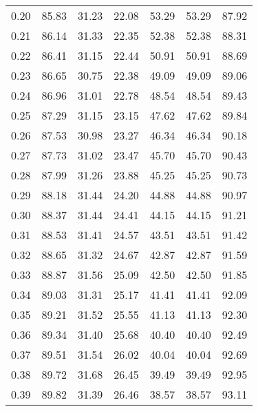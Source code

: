 \begin{tabular}{|c|c|c|c|c|c|c|}
      0.20 &     85.83 &     31.23 &      22.08 &   53.29 &      53.29 &         87.92 \\
      0.21 &     86.14 &     31.33 &      22.35 &   52.38 &      52.38 &         88.31 \\
      0.22 &     86.41 &     31.15 &      22.44 &   50.91 &      50.91 &         88.69 \\
      0.23 &     86.65 &     30.75 &      22.38 &   49.09 &      49.09 &         89.06 \\
      0.24 &     86.96 &     31.01 &      22.78 &   48.54 &      48.54 &         89.43 \\
      0.25 &     87.29 &     31.15 &      23.15 &   47.62 &      47.62 &         89.84 \\
      0.26 &     87.53 &     30.98 &      23.27 &   46.34 &      46.34 &         90.18 \\
      0.27 &     87.73 &     31.02 &      23.47 &   45.70 &      45.70 &         90.43 \\
      0.28 &     87.99 &     31.26 &      23.88 &   45.25 &      45.25 &         90.73 \\
      0.29 &     88.18 &     31.44 &      24.20 &   44.88 &      44.88 &         90.97 \\
      0.30 &     88.37 &     31.44 &      24.41 &   44.15 &      44.15 &         91.21 \\
      0.31 &     88.53 &     31.41 &      24.57 &   43.51 &      43.51 &         91.42 \\
      0.32 &     88.65 &     31.32 &      24.67 &   42.87 &      42.87 &         91.59 \\
      0.33 &     88.87 &     31.56 &      25.09 &   42.50 &      42.50 &         91.85 \\
      0.34 &     89.03 &     31.31 &      25.17 &   41.41 &      41.41 &         92.09 \\
      0.35 &     89.21 &     31.52 &      25.55 &   41.13 &      41.13 &         92.30 \\
      0.36 &     89.34 &     31.40 &      25.68 &   40.40 &      40.40 &         92.49 \\
      0.37 &     89.51 &     31.54 &      26.02 &   40.04 &      40.04 &         92.69 \\
      0.38 &     89.72 &     31.68 &      26.45 &   39.49 &      39.49 &         92.95 \\
      0.39 &     89.82 &     31.39 &      26.46 &   38.57 &      38.57 &         93.11 \\

\end{tabular}
